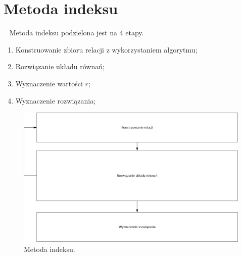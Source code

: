 \documentclass[]{article}
\begin{document}
\section{Metoda indeksu}~
	Metoda indeksu podzielona jest na 4 etapy. 
	\begin{enumerate}
		\item Konstruowanie zbioru relacji z wykorzystaniem algorytmu;
		\item Rozwiązanie układu równań;
		\item Wyznaczenie wartości \(r\);
		\item Wyznaczenie rozwiązania;
	\end{enumerate}
	\begin{figure}[h]
		\begin{center}
			\includegraphics[width=15cm]{./img/schemat_1.png}
			\caption{Metoda indeksu. }
		\end{center}
	\end{figure}
\end{document}
